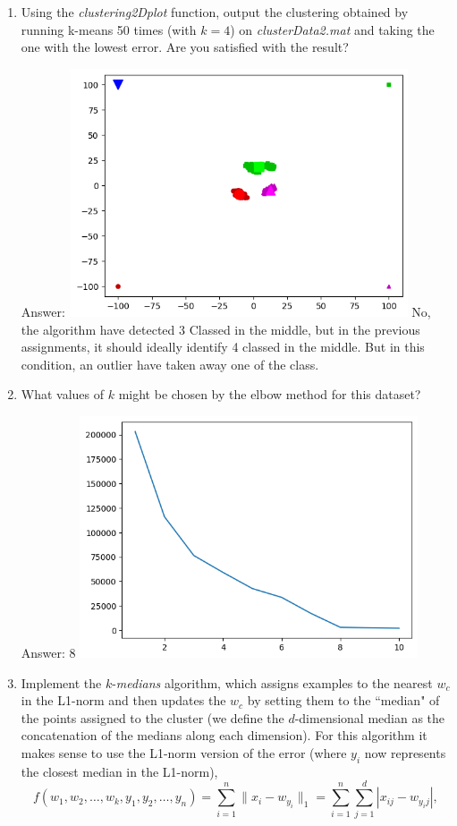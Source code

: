 \documentclass{article}
\def\ans#1{\par\gre{Answer: #1}}
\def\blu#1{{\color{blu}#1}}
\def\gre#1{{\color{gre}#1}}
\def\norm#1{\|#1\|}
\def\enum#1{\begin{enumerate}#1\end{enumerate}}
\begin{document}
 \blu{\enum{
 \item Using the \emph{clustering2Dplot} function, output the clustering obtained by running k-means 50 times (with $k=4$) on \emph{clusterData2.mat} and taking the one with the lowest error. Are you satisfied with the result?  \ans{ \includegraphics[width=10cm]{q1Class.png}  No, the algorithm have detected 3 Classed in the middle, but in the previous assignments, it should ideally identify 4 classed in the middle. But in this condition, an outlier have taken away one of the class.}
 \item What values of $k$ might be chosen by the elbow method for this dataset? \ans{8 \includegraphics[width=10cm]{Q1.png}}
 \item Implement the $k$-\emph{medians} algorithm, which assigns examples to the nearest $w_c$ in the L1-norm and then updates the $w_c$ by setting them to the ``median" of the points assigned to the cluster (we define the $d$-dimensional median as the concatenation of the medians along each dimension). For this algorithm it makes sense to use the L1-norm version of the error (where $y_i$ now represents the closest median in the L1-norm),
\[
f(w_1,w_2,\dots,w_k,y_1,y_2,\dots,y_n) = \sum_{i=1}^n \norm{x_i - w_{y_i}}_1 = \sum_{i=1}^n \sum_{j=1}^d |x_{ij} - w_{y_ij}|,
\]}}
\end{document}
